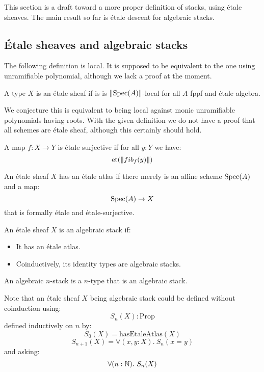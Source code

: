 This section is a draft toward a more proper definition of stacks, using étale sheaves. The main result so far is étale descent for algebraic stacks.

\subsection{Étale sheaves and algebraic stacks}

The following definition is local. It is supposed to be equivalent to the one using unramifiable polynomial, although we lack a proof at the moment.

\begin{definition}
A type $X$ is an étale sheaf if is is $\lVert \operatorname{Spec}(A) \rVert$-local for all $A$ fppf and étale algebra.
\end{definition}

\begin{remark}
We conjecture this is equivalent to being local against monic unramifiable polynomials having roots. With the given definition we do not have a proof that all schemes are étale sheaf, although this certainly should hold.
\end{remark}

\begin{definition}
A map $f:X\to Y$ is étale surjective if for all $y:Y$ we have:
\[ \mathrm{et}(\lVert fib_f(y) \rVert)\]
\end{definition}

\begin{definition}
An étale sheaf $X$ has an étale atlas if there merely is an affine scheme $\operatorname{Spec}(A)$ and a map:
\[\operatorname{Spec}(A)\to X\]
that is formally étale and étale-surjective.
\end{definition}

\begin{definition}
An étale sheaf $X$ is an algebraic stack if:
\begin{itemize}
\item It has an étale atlas.
\item Coinductively, its identity types are algebraic stacks.
\end{itemize} 
\end{definition}

An algebraic $n$-stack is a $n$-type that is an algebraic stack. 

\begin{remark}
Note that an étale sheaf $X$ being algebraic stack could be defined without coinduction using:
\[S_n(X): \mathrm{Prop}\]
defined inductively on $n$ by:
\[S_0(X) = \mathrm{hasEtaleAtlas}(X)\]
\[S_{n+1}(X) = \forall(x,y:X).\ S_n(x=y)\]
and asking:
\[\forall(n:\N).\ S_n(X)\]
\end{remark}


